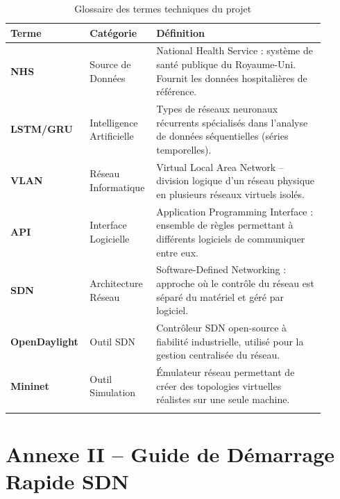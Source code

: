 \documentclass[12pt,a4paper]{article}
\begin{document}
\begin{longtable}{|p{0.18\linewidth}|p{0.2\linewidth}|p{0.52\linewidth}|}
\hline
\rowcolor{primaryblue!15}
\textbf{Terme} & \textbf{Catégorie} & \textbf{Définition} \\
\hline
\endhead
\textbf{NHS} & Source de Données & National Health Service : système de santé publique du Royaume-Uni. Fournit les données hospitalières de référence. \\
\hline
\textbf{LSTM/GRU} & Intelligence Artificielle & Types de réseaux neuronaux récurrents spécialisés dans l'analyse de données séquentielles (séries temporelles). \\
\hline
\textbf{VLAN} & Réseau Informatique & Virtual Local Area Network -- division logique d'un réseau physique en plusieurs réseaux virtuels isolés. \\
\hline
\textbf{API} & Interface Logicielle & Application Programming Interface : ensemble de règles permettant à différents logiciels de communiquer entre eux. \\
\hline
\textbf{SDN} & Architecture Réseau & Software-Defined Networking : approche où le contrôle du réseau est séparé du matériel et géré par logiciel. \\
\hline
\textbf{OpenDaylight} & Outil SDN & Contrôleur SDN open-source à fiabilité industrielle, utilisé pour la gestion centralisée du réseau. \\
\hline
\textbf{Mininet} & Outil Simulation & Émulateur réseau permettant de créer des topologies virtuelles réalistes sur une seule machine. \\
\hline
\caption{Glossaire des termes techniques du projet}
\label{tab:glossaire}
\end{longtable}

\section{Annexe II -- Guide de Démarrage Rapide SDN}
\end{document}
